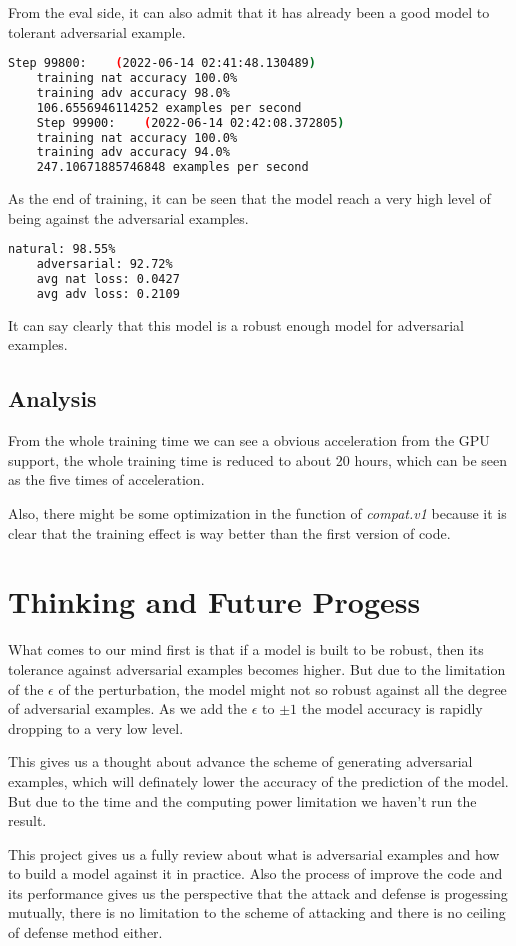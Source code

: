 \documentclass[
	letterpaper, %
	10pt, %
]{CSUniSchoolLabReport}
\begin{document}
From the eval side, it can also admit that it has already been a good model to tolerant adversarial example.
\begin{lstlisting}[language=bash]
	Step 99800:    (2022-06-14 02:41:48.130489)
	training nat accuracy 100.0%
	training adv accuracy 98.0%
	106.6556946114252 examples per second
	Step 99900:    (2022-06-14 02:42:08.372805)
	training nat accuracy 100.0%
	training adv accuracy 94.0%
	247.10671885746848 examples per second
\end{lstlisting}
As the end of training, it can be seen that the model reach a very high level of being against the adversarial examples.
\begin{lstlisting}[language=bash]
	natural: 98.55%
	adversarial: 92.72%
	avg nat loss: 0.0427
	avg adv loss: 0.2109
\end{lstlisting}
It can say clearly that this model is a robust enough model for adversarial examples.
\subsection{Analysis}
From the whole training time we can see a obvious acceleration from the GPU support, the whole training time is reduced to about 20 hours, which can be seen as the five times of acceleration.

Also, there might be some optimization in the function of \emph{compat.v1} because it is clear that the training effect is way better than the first version of code.  
\section{Thinking and Future Progess}
What comes to our mind first is that if a model is built to be robust, then its tolerance against adversarial examples becomes higher. But due to the limitation of the $\epsilon$ of the perturbation, the model might not so robust against all the degree of adversarial examples. As we add the $\epsilon$ to $\pm1$ the model accuracy is rapidly dropping to a very low level.

This gives us a thought about advance the scheme of generating adversarial examples, which will definately lower the accuracy of the prediction of the model. But due to the time and the computing power limitation we haven't run the result.

This project gives us a fully review about what is adversarial examples and how to build a model against it in practice. Also the process of improve the code and its performance gives us the perspective that the attack and defense is progessing mutually, there is no limitation to the scheme of attacking and there is no ceiling of defense method either.
\end{document}
